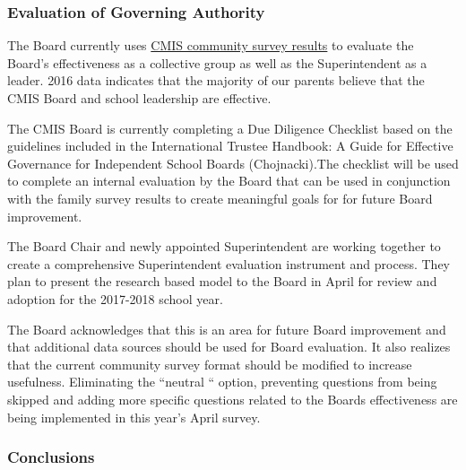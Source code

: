 \subsubsection{Evaluation of Governing Authority}



\begin{findings}
The Board currently uses \href{https://docs.google.com/a/cmis.ac.th/document/d/1_otvw47y3Z-1CSjXnKhgRTauVRqPl1S6nSdmsb00O2k/edit?usp=sharing}{CMIS community survey results} to evaluate the Board’s effectiveness as a collective group as well as the Superintendent as a leader. 2016 data indicates that the majority of our parents believe that the CMIS Board and school leadership are effective.

The CMIS Board is currently completing a Due Diligence Checklist based on the guidelines included in the International Trustee Handbook: A Guide for Effective Governance for Independent School Boards (Chojnacki).The checklist will be used to complete an internal evaluation by the Board that can be used in conjunction with the family survey results to create meaningful goals for for future Board improvement.

The Board Chair and newly appointed Superintendent are working together to create a comprehensive Superintendent evaluation instrument and process. They plan to present the research based model to the Board in April for review and adoption for the 2017-2018 school year.


The Board acknowledges that this is an area for future Board improvement and that additional data sources should be used for Board evaluation. It also realizes that the current community survey format should be modified to increase usefulness. Eliminating the “neutral “ option, preventing questions from being skipped and adding more specific questions related to the Boards effectiveness are being implemented in this year’s April survey.
\end{findings}

\subsubsection{Conclusions}

